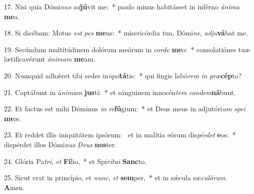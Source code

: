 17. Nisi quia Dómi\textit{nus} \textit{ad}\textbf{jú}vit me:~*  paulo minus habitásset in inférno \textit{á}\textit{ni}\textit{ma} \textbf{me}a.\

18. Si dicébam: Motus \textit{est} \textit{pes} \textbf{me}us:~*  misericórdia tua, Dómi\textit{ne}, \textit{ad}\textit{ju}\textbf{vá}bat me.\

19. Secúndum multitúdinem dolórum meórum in \textit{cor}\textit{de} \textbf{me}o:~*  consolatiónes tuæ lætificavérunt \textit{á}\textit{ni}\textit{mam} \textbf{me}am.\

20. Numquid adhǽret tibi sedes in\textit{i}\textit{qui}\textbf{tá}tis:~*  qui fingis labó\textit{rem} \textit{in} \textit{præ}\textbf{cép}to?\

21. Captábunt in á\textit{ni}\textit{mam} \textbf{jus}ti:~*  et sánguinem innocén\textit{tem} \textit{con}\textit{dem}\textbf{ná}bunt.\

22. Et factus est mihi Dóminus \textit{in} \textit{re}\textbf{fú}gium:~*  et Deus meus in adjutóri\textit{um} \textit{spe}\textit{i} \textbf{me}æ.\

23. Et reddet illis iniquitátem ipsórum: \dag\  et in malítia eórum dis\textit{pér}\textit{det} \textbf{e}os:~*  dispérdet illos Dómi\textit{nus} \textit{De}\textit{us} \textbf{nos}ter.\

24. Glória Pa\textit{tri}, \textit{et} \textbf{Fí}lio,~*  et Spi\textit{rí}\textit{tu}\textit{i} \textbf{Sanc}to.\

25. Sicut erat in princípio, et \textit{nunc}, \textit{et} \textbf{sem}per,~*  et in sǽcula sæ\textit{cu}\textit{ló}\textit{rum}. \textbf{A}men.\


